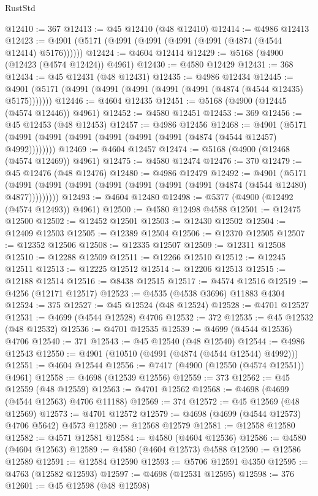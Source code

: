 \begin{lexlean}{RustStd}
\begin{coremodule}
@12410 := 367
@12413 := @45 @12410 (@48 @12410)
@12414 := @4986 @12413
@12423 := @4901 (@5171 (@4991 (@4991 (@4991 (@4991 (@4874 (@4544 @12414) @5176))))))
@12424 := @4604 @12414
@12429 := @5168 (@4900 (@12423 (@4574 @12424)) @4961)
@12430 := @4580 @12429
@12431 := 368
@12434 := @45 @12431 (@48 @12431)
@12435 := @4986 @12434
@12445 := @4901 (@5171 (@4991 (@4991 (@4991 (@4991 (@4991 (@4874 (@4544 @12435) @5175)))))))
@12446 := @4604 @12435
@12451 := @5168 (@4900 (@12445 (@4574 @12446)) @4961)
@12452 := @4580 @12451
@12453 := 369
@12456 := @45 @12453 (@48 @12453)
@12457 := @4986 @12456
@12468 := @4901 (@5171 (@4991 (@4991 (@4991 (@4991 (@4991 (@4991 (@4874 (@4544 @12457) @4992))))))))
@12469 := @4604 @12457
@12474 := @5168 (@4900 (@12468 (@4574 @12469)) @4961)
@12475 := @4580 @12474
@12476 := 370
@12479 := @45 @12476 (@48 @12476)
@12480 := @4986 @12479
@12492 := @4901
    (@5171 (@4991 (@4991 (@4991 (@4991 (@4991 (@4991 (@4991 (@4874 (@4544 @12480) @4877)))))))))
@12493 := @4604 @12480
@12498 := @5377 (@4900 (@12492 (@4574 @12493)) @4961)
@12500 := @4580 @12498 @4588
@12501 := @12475 @12500
@12502 := @12452 @12501
@12503 := @12430 @12502
@12504 := @12409 @12503
@12505 := @12389 @12504
@12506 := @12370 @12505
@12507 := @12352 @12506
@12508 := @12335 @12507
@12509 := @12311 @12508
@12510 := @12288 @12509
@12511 := @12266 @12510
@12512 := @12245 @12511
@12513 := @12225 @12512
@12514 := @12206 @12513
@12515 := @12188 @12514
@12516 := @8438 @12515
@12517 := @4574 @12516
@12519 := @4256 (@12171 @12517)
@12523 := @4535 (@4538 @3696) @11883 @4304
@12524 := 375
@12527 := @45 @12524 (@48 @12524)
@12528 := @4701 @12527
@12531 := @4699 (@4544 @12528) @4706
@12532 := 372
@12535 := @45 @12532 (@48 @12532)
@12536 := @4701 @12535
@12539 := @4699 (@4544 @12536) @4706
@12540 := 371
@12543 := @45 @12540 (@48 @12540)
@12544 := @4986 @12543
@12550 := @4901 (@10510 (@4991 (@4874 (@4544 @12544) @4992)))
@12551 := @4604 @12544
@12556 := @7417 (@4900 (@12550 (@4574 @12551)) @4961)
@12558 := @4698 (@12539 @12556)
@12559 := 373
@12562 := @45 @12559 (@48 @12559)
@12563 := @4701 @12562
@12568 := @4698 (@4699 (@4544 @12563) @4706 @11188)
@12569 := 374
@12572 := @45 @12569 (@48 @12569)
@12573 := @4701 @12572
@12579 := @4698 (@4699 (@4544 @12573) @4706 @5642) @4573
@12580 := @12568 @12579
@12581 := @12558 @12580
@12582 := @4571 @12581
@12584 := @4580 (@4604 @12536)
@12586 := @4580 (@4604 @12563)
@12589 := @4580 (@4604 @12573) @4588
@12590 := @12586 @12589
@12591 := @12584 @12590
@12593 := @5706 @12591 @4350
@12595 := @4763 (@12582 @12593)
@12597 := @4698 (@12531 @12595)
@12598 := 376
@12601 := @45 @12598 (@48 @12598)

\end{coremodule}
\end{lexlean}
